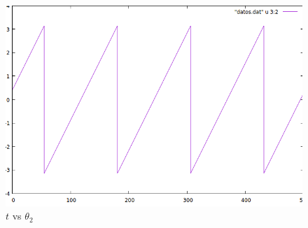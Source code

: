 \documentclass[12pt,a4paper]{article}
\begin{document}
\begin{figure}
    \centering
    \includegraphics[scale=0.8]{2.PNG}
    \caption{$t$ vs $\theta_2$}
\end{figure}
\end{document}
